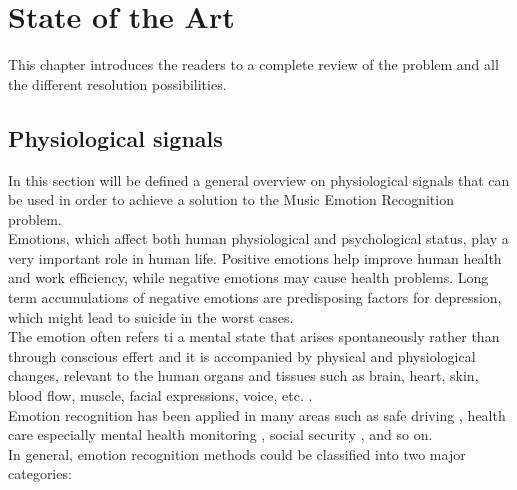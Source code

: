 \chapter{State of the Art}
\label{chap:StateOfTheArt}
\pagestyle{plain}
\vspace{0.5cm}

\noindent This chapter introduces the readers to a complete review of the problem and all the different resolution possibilities.

\section{Physiological signals}
In this section will be defined a general overview on physiological signals that can be used in order to achieve a solution to the Music Emotion Recognition problem.
\\ \indent
Emotions, which affect both human physiological and psychological status, play a very important role in human life. Positive emotions help improve human health and work efficiency, while negative emotions may cause health problems. Long term accumulations of negative emotions are predisposing factors for depression, which might lead to suicide in the worst cases.
\\
The emotion often refers ti a mental state that arises spontaneously rather than through conscious effert and it is accompanied by physical and physiological changes, relevant to the human organs and tissues such as brain, heart, skin, blood flow, muscle, facial expressions, voice, etc. \cite{shu2018review}.
\\ \indent
Emotion recognition has been applied in many areas such as safe driving \cite{de2016enhancing}, health care especially mental health monitoring \cite{guo2013pervasive}, social security \cite{verschuere2006psychopathy}, and so on.
\\
In general, emotion recognition methods could be classified into two major categories:
